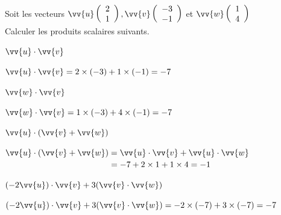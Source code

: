 \documentclass[12pt,a4paper]{article}  %
\begin{document}
Soit les vecteurs $\vv{u}\left(\begin{array}{l}2 \\ 1\end{array}\right), \vv{v}\left(\begin{array}{c}-3 \\ -1\end{array}\right)$ et $\vv{w}\left(\begin{array}{l}1 \\ 4\end{array}\right)$\\
Calculer les produits scalaires suivants.
\begin{enumMet}
    \item $\vv{u} \cdot \vv{v}$\\
    \begin{corrBox}
        $\vv{u} \cdot \vv{v}=2\times(-3)+1\times(-1)=-7$
    \end{corrBox}
    \item $\vv{w} \cdot \vv{v}$\\
    \begin{corrBox}
        $\vv{w} \cdot \vv{v}=1\times(-3)+4\times(-1)=-7$
    \end{corrBox}
    \item {} $\vv{u} \cdot(\vv{v}+\vv{w})$\\
    \begin{corrBox}
        $\vv{u} \cdot(\vv{v}+\vv{w})= \vv{u} \cdot \vv{v}+\vv{u} \cdot \vv{w}$\\
        $\phantom{\vv{u} \cdot(\vv{v}+\vv{w})}=-7+2\times1+1\times4=-1$
    \end{corrBox}
    \item $(-2 \vv{u}) \cdot \vv{v}+3(\vv{v} \cdot \vv{w})$\\
    \begin{corrBox}
        $(-2 \vv{u}) \cdot \vv{v}+3(\vv{v} \cdot \vv{w})=-2\times(-7)+3\times(-7)=-7$
    \end{corrBox}
\end{enumMet}
\end{document}
